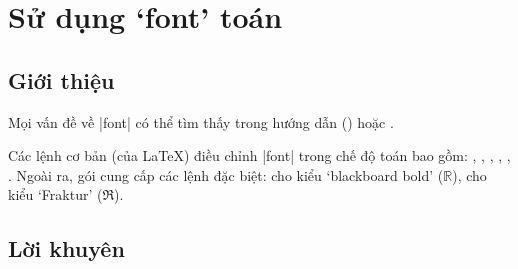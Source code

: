 \chapter{Sử dụng `font' toán}

\section{Giới thiệu}

Mọi vấn đề về |font| có thể tìm thấy trong hướng dẫn ()
hoặc  \cite{tlc}.

\medskip
Các lệnh cơ bản (của \LaTeX{})
điều chỉnh |font| trong chế độ toán bao gồm:
, , , , , .
Ngoài ra, gói  cung cấp các lệnh đặc biệt:
 cho kiểu `blackboard bold' ($\mathbb R$),
 cho kiểu `Fraktur' ($\mathfrak R$).

\section{Lời khuyên}

